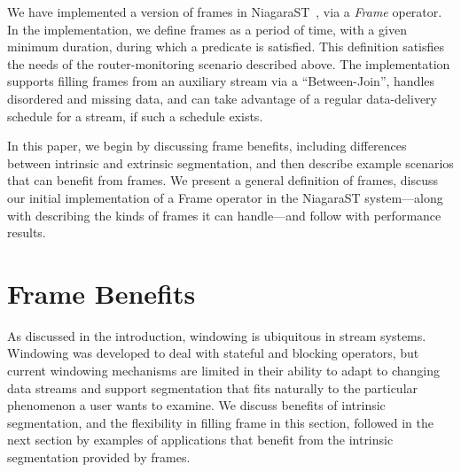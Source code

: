 \documentclass{vldb}
\newcommand{\dquote}[1]{``#1''}
\begin{document}
We have implemented a version of frames in NiagaraST~\cite{LTS+2008}, via a \emph{Frame} operator. In the implementation, we define frames as a period of time, with a given minimum duration, during which a predicate is satisfied. This definition satisfies the needs of the router-monitoring scenario described above. The implementation supports filling frames from an auxiliary stream via a \dquote{Between-Join}, handles disordered and missing data, and can take advantage of a regular data-delivery schedule for a stream, if such a schedule exists.

In this paper, we begin by discussing frame benefits, including differences between intrinsic and extrinsic segmentation, and then describe example scenarios that can benefit from frames. We present a general definition of frames, discuss our initial implementation of a Frame operator in the NiagaraST system---along with describing the kinds of frames it can handle---and follow with performance results. 

\section{Frame Benefits}
\label{sec:benefits}

As discussed in the introduction, windowing is ubiquitous in stream systems. Windowing was developed to deal with stateful and blocking operators, but current windowing mechanisms are limited in their ability to adapt to changing data streams and support segmentation that fits naturally to the particular phenomenon a user wants to examine. We discuss benefits of intrinsic segmentation, and the flexibility in filling frame in this section, followed in the next section by examples of applications that benefit from the intrinsic segmentation provided by frames. 
\end{document}
